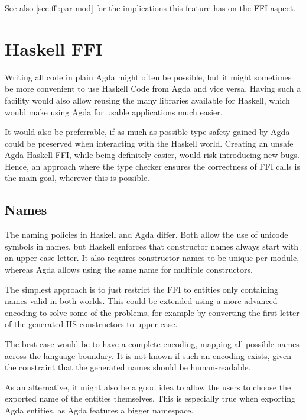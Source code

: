 \documentclass[12pt, a4paper, twoside]{report}
\begin{document}
See also \ref{sec:ffi:par-mod} for the implications this feature has on the FFI aspect.

\section{Haskell FFI}
\label{sec:prop:hs-ffi}
Writing all code in plain Agda might often be possible, but it might sometimes be more
convenient to use Haskell Code from Agda and vice versa. Having such a facility would
also allow reusing the many libraries available for Haskell, which would make using Agda
for usable applications much easier.

It would also be preferrable, if as much as possible type-safety gained by Agda could be
preserved when interacting with the Haskell world. Creating an unsafe Agda-Haskell
FFI, while being definitely easier, would risk introducing new bugs. Hence, an approach
where the type checker ensures the correctness of FFI calls is the main goal, wherever
this is possible.


\subsection{Names}
The naming policies in Haskell and Agda differ. Both allow the use of unicode symbols in names, but Haskell enforces
that constructor names always start with an upper case letter. It also requires constructor names to be unique
per module, whereas Agda allows using the same name for multiple constructors.

The simplest approach is to just restrict the FFI to entities only containing names valid in both worlds.
This could be extended using a more advanced encoding to solve some of the problems, for example
by converting the first letter of the generated HS constructors to upper case.

The best case would be to have a complete encoding, mapping all possible names across the language boundary. It is not known
if such an encoding exists, given the constraint that the generated names should be human-readable.

As an alternative, it might also be a good idea to allow the users to choose the exported name of the entities themselves.
This is especially true when exporting Agda entities, as Agda features a bigger namespace.
\end{document}

